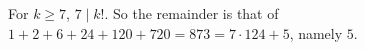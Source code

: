 For $k\ge7$, $7\mid k!$. So the remainder is that of $1+2+6+24+120+720=873=7\cdot124+5$, namely $\boxed{5}$.
